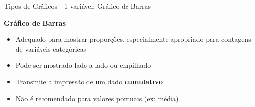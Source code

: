 \documentclass{beamer}\usepackage[]{graphicx}\usepackage[]{color}
\begin{document}


\begin{frame}{Tipos de Gráficos - 1 variável: Gráfico de Barras} 

\textbf{Gráfico de Barras}
  
\begin{itemize}
  \item Adequado para mostrar proporções, especialmente apropriado para contagens de variáveis categóricas \pause
  \vfill
  \item  Pode ser mostrado lado a lado ou empilhado \pause
  \vfill
  \item Transmite a impressão de um dado \textbf{cumulativo} \pause
  \vfill
  \item Não é recomendado para valores pontuais (ex: média)
\end{itemize}


\end{frame} 
\end{document}
